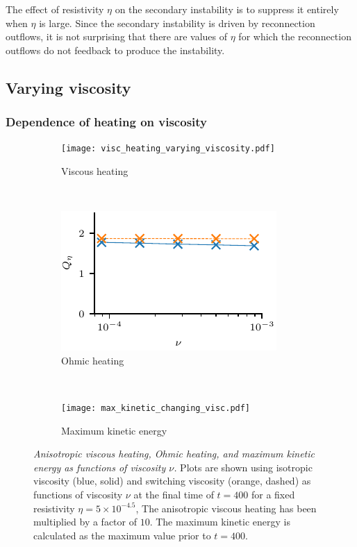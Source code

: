 The effect of resistivity $\eta$ on the secondary instability is to suppress it entirely when $\eta$ is large. Since the secondary instability is driven by reconnection outflows, it is not surprising that there are values of $\eta$ for which the reconnection outflows do not feedback to produce the instability.

\subsection{Varying viscosity}

\label{sec:visc_param_study}

\subsubsection{Dependence of heating on viscosity}

\begin{figure}[t]
    \centering
    \begin{subfigure}[t]{0.32\textwidth}
      \texttt{[image: visc\_heating\_varying\_viscosity.pdf]}
      \caption{Viscous heating}
    \end{subfigure}%
    ~
    \begin{subfigure}[t]{0.32\textwidth}
      \includegraphics[width=\textwidth]{ohmic_heating_varying_viscosity.pdf}
      \caption{Ohmic heating}
    \end{subfigure}
    ~
    \begin{subfigure}[t]{0.32\textwidth}
      \texttt{[image: max\_kinetic\_changing\_visc.pdf]}
      \caption{Maximum kinetic energy}
    \end{subfigure}
    \caption{\textit{Anisotropic viscous heating, Ohmic heating, and maximum kinetic energy as functions of viscosity $\nu$.} Plots are shown using isotropic viscosity (blue, solid) and switching viscosity (orange, dashed) as functions of viscosity $\nu$ at the final time of $t=400$ for a fixed resistivity $\eta=5\times10^{-4.5}$, The anisotropic viscous heating has been multiplied by a factor of $10$. The maximum kinetic energy is calculated as the maximum value prior to $t=400$.}
    \label{fig:param_study_varying_viscosity}
\end{figure}

